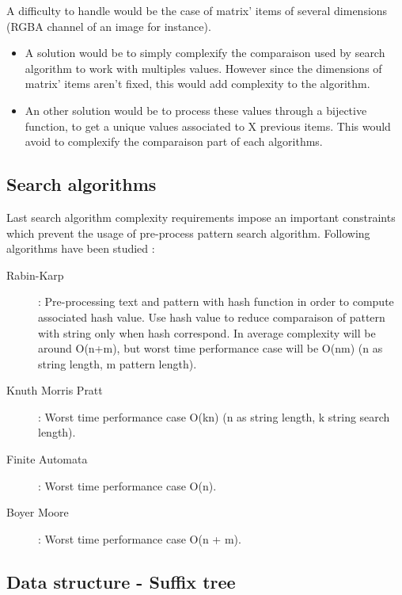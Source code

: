 A difficulty to handle would be the case of matrix' items of several dimensions (RGBA channel of an image for instance).
\begin{itemize}
	\item A solution would be to simply complexify the comparaison used by search algorithm to work with multiples values. However since the dimensions of matrix' items aren't fixed, this would add complexity to the algorithm.
	\item An other solution would be to process these values through a bijective function, to get a unique values associated to X previous items. This would avoid to complexify the comparaison part of each algorithms.
\end{itemize}


\subsection{Search algorithms}

\par
Last search algorithm complexity requirements impose an important constraints which prevent the usage of pre-process pattern search algorithm. Following algorithms have been studied :
\begin{description}
	\item[Rabin-Karp] : Pre-processing text and pattern with hash function in order to compute associated hash value. Use hash value to reduce comparaison of pattern with string only when hash correspond. In average complexity will be around O(n+m), but worst time performance case will be O(nm) (n as string length, m pattern length).
	\item[Knuth Morris Pratt] : Worst time performance case O(kn) (n as string length, k string search length).
	\item[Finite Automata] : Worst time performance case O(n).
	\item[Boyer Moore] : Worst time performance case O(n + m).
\end{description}

\subsection{Data structure - Suffix tree}

